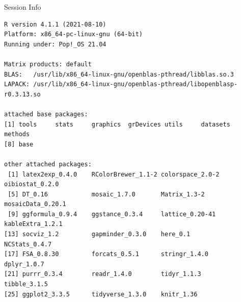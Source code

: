 \documentclass[10pt,handout]{beamer}\usepackage[]{graphicx}\usepackage[]{color}
\makeatletter
\newenvironment{kframe}{%
 \def\at@end@of@kframe{}%
 \ifinner\ifhmode%
  \def\at@end@of@kframe{\end{minipage}}%
  \begin{minipage}{\columnwidth}%
 \fi\fi%
 \def\FrameCommand##1{\hskip\@totalleftmargin \hskip-\fboxsep
 \colorbox{shadecolor}{##1}\hskip-\fboxsep
     \hskip-\linewidth \hskip-\@totalleftmargin \hskip\columnwidth}%
 \MakeFramed {\advance\hsize-\width
   \@totalleftmargin\z@ \linewidth\hsize
   \@setminipage}}%
 {\par\unskip\endMakeFramed%
 \at@end@of@kframe}
\newenvironment{knitrout}{}{} %
\makeatother
\begin{document}
\begin{frame}[fragile]{Session Info}
	\tiny
	
\begin{knitrout}\tiny
{}\color{fgcolor}\begin{kframe}
\begin{verbatim}
R version 4.1.1 (2021-08-10)
Platform: x86_64-pc-linux-gnu (64-bit)
Running under: Pop!_OS 21.04

Matrix products: default
BLAS:   /usr/lib/x86_64-linux-gnu/openblas-pthread/libblas.so.3
LAPACK: /usr/lib/x86_64-linux-gnu/openblas-pthread/libopenblasp-r0.3.13.so

attached base packages:
[1] tools     stats     graphics  grDevices utils     datasets  methods  
[8] base     

other attached packages:
 [1] latex2exp_0.4.0    RColorBrewer_1.1-2 colorspace_2.0-2   oibiostat_0.2.0   
 [5] DT_0.16            mosaic_1.7.0       Matrix_1.3-2       mosaicData_0.20.1 
 [9] ggformula_0.9.4    ggstance_0.3.4     lattice_0.20-41    kableExtra_1.2.1  
[13] socviz_1.2         gapminder_0.3.0    here_0.1           NCStats_0.4.7     
[17] FSA_0.8.30         forcats_0.5.1      stringr_1.4.0      dplyr_1.0.7       
[21] purrr_0.3.4        readr_1.4.0        tidyr_1.1.3        tibble_3.1.5      
[25] ggplot2_3.3.5      tidyverse_1.3.0    knitr_1.36        


\end{verbatim}
\end{kframe}
\end{knitrout}
\end{frame}
\end{document}
